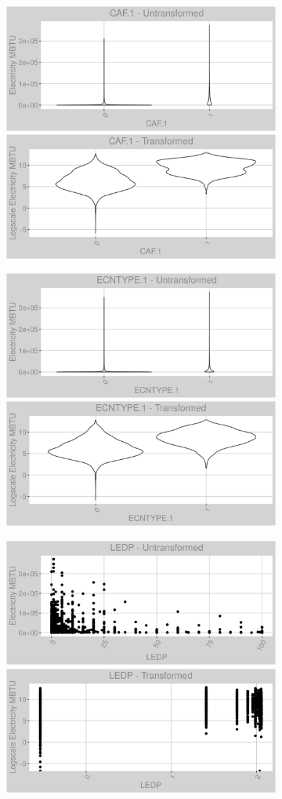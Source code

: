 \newpage
\begin{figure}
\centering
\begin{subfigure}{1\textwidth}
\includegraphics[width=.49\textwidth, height=0.3\textheight]{Images/electricity_var_original_14.png}
\includegraphics[width=.49\textwidth, height=0.3\textheight]{Images/electricity_var_transformed_14.png}
\end{subfigure}
\begin{subfigure}{1\textwidth}
\centering
\includegraphics[width=.49\textwidth, height=0.3\textheight]{Images/electricity_var_original_15.png}
\includegraphics[width=.49\textwidth, height=0.3\textheight]{Images/electricity_var_transformed_15.png}
\end{subfigure}
\begin{subfigure}{1\textwidth}
\centering
\includegraphics[width=.49\textwidth, height=0.3\textheight]{Images/electricity_var_original_16.png}
\includegraphics[width=.49\textwidth, height=0.3\textheight]{Images/electricity_var_transformed_16.png}
\end{subfigure}
\end{figure}
